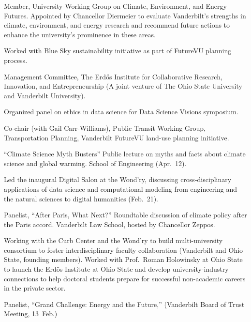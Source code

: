 \item[2021] Member, University Working Group on Climate, Environment, and Energy
  Futures.
  Appointed by Chancellor Diermeier to evaluate Vanderbilt's strengths in climate,
  environment, and energy research and recommend future actions to enhance
  the university's prominence in these areas.
\item[2018--2019] Worked with Blue Sky sustainability initiative as part of
  FutureVU planning process.
\item[2017--2019] Management Committee, The Erd\H{o}s Institute for
  Collaborative Research, Innovation, and Entrepreneurship (A joint venture of
  The Ohio State University and Vanderbilt University).
\item[2018] Organized panel on ethics in data science for Data Science Visions
symposium.
\item[2017] Co-chair (with Gail Carr-Williams), Public Transit Working Group,
  Transportation Planning, Vanderbilt FutureVU land-use planning initiative.
\item[2017] ``Climate Science Myth Busters'' Public lecture on myths and facts
  about climate science and global warming. School of Engineering (Apr.~12).
\item[2017] Led the inaugural Digital Salon at the Wond'ry, discussing
  cross-disciplinary applications of data science and computational modeling
  from engineering and the natural sciences to digital humanities (Feb.~21).
\item[2016] Panelist, ``After Paris, What Next?''  Roundtable discussion of
  climate policy after the Paris accord. Vanderbilt Law School, hosted by
  Chancellor Zeppos.
\item[2015--2017] Working with the Curb Center and the Wond'ry to build
  multi-university consortium to foster interdisciplinary faculty collaboration
  (Vanderbilt and Ohio State, founding members).  Worked with Prof.\ Roman
  Holowinsky at Ohio State to launch the Erd\"os Institute at Ohio State and
  develop university-industry connections to help doctoral students prepare for
  successful non-academic careers in the private sector.
\item[2015] Panelist, ``Grand Challenge: Energy and the Future,'' (Vanderbilt
  Board of Trust Meeting, 13~Feb.)
